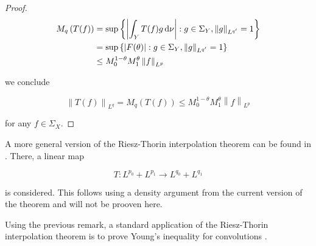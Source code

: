 \begin{proof}
\begin{gather*}
	\begin{aligned}
		M_q\left( T(f) \right) &= \sup\left\{\left| \int_Y T(f)g\mathop{}\!\mathrm{d}\nu\right| : g \in \Sigma_Y, \left\|g\right\|_{L^{q'}} = 1\right\}\\
		&=  \sup\left\{\left| F(\theta)\right| : g \in \Sigma_Y, \left\|g\right\|_{L^{q'}} = 1\right\}\\
		&\leq M_0^{1 - \theta}M_1^\theta \left\|f\right\|_{L^p}\\
	\end{aligned}
\end{gather*}

\noindent we conclude 
	
\begin{equation*}
	\left\| T(f)\right\|_{L^q} = M_q\left( T(f) \right) \leq M_0^{1 - \theta}M_1^\theta \left\|f\right\|_{L^p}
\end{equation*}
	
\noindent for any $f \in \Sigma_X$.
\end{proof}

\begin{remark}
	A more general version of the Riesz-Thorin interpolation theorem can be found in \textup{\cite[200--202]{folland:real_analysis:1999}}. There, a linear map 

	\begin{equation*}
		T: L^{p_0} + L^{p_1} \rightarrow L^{q_0} + L^{q_1}
	\end{equation*}

	\noindent is considered. This follows using a density argument from the current version of the theorem and will not be prooven here.
	\label{rem:extension}
\end{remark}

\begin{remark}
	Using the previous remark, a standard application of the Riesz-Thorin interpolation theorem is to prove Young's inequality for convolutions \textup{\cite[22--23]{grafakos:fourier:2014}}.
\end{remark}

